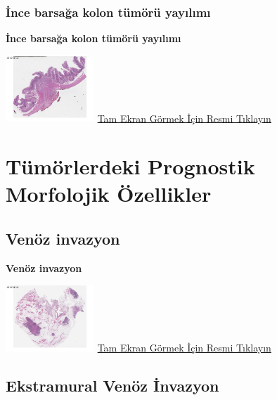 \documentclass[
  letterpaper,
  DIV=11,
  numbers=noendperiod]{scrreprt}
\begin{document}
\hypertarget{sec-ince-barsak-kolon-tumor-yayilimi}{%
\section{İnce barsağa kolon tümörü
yayılımı}\label{sec-ince-barsak-kolon-tumor-yayilimi}}

\textbf{İnce barsağa kolon tümörü yayılımı}

\href{https://images.patolojiatlasi.com/tumor-spread/HE-small-intestine.html}{\includegraphics[width=0.25\textwidth,height=\textheight]{./screenshots/tumor-spread-small-intestine_screenshot.png}}
\href{https://images.patolojiatlasi.com/tumor-spread/HE-small-intestine.html}{Tam
Ekran Görmek İçin Resmi Tıklayın}

\part{Tümörlerdeki Prognostik Morfolojik Özellikler}

\hypertarget{sec-venoz-invazyon}{%
\chapter{Venöz invazyon}\label{sec-venoz-invazyon}}

\textbf{Venöz invazyon}

\href{https://images.patolojiatlasi.com/venous-invasion/HE.html}{\includegraphics[width=0.25\textwidth,height=\textheight]{./screenshots/venous-invasion_screenshot.png}}
\href{https://images.patolojiatlasi.com/venous-invasion/HE.html}{Tam
Ekran Görmek İçin Resmi Tıklayın}

\hypertarget{sec-ekstramural-venoz-invazyon}{%
\chapter{Ekstramural Venöz
İnvazyon}\label{sec-ekstramural-venoz-invazyon}}
\end{document}
